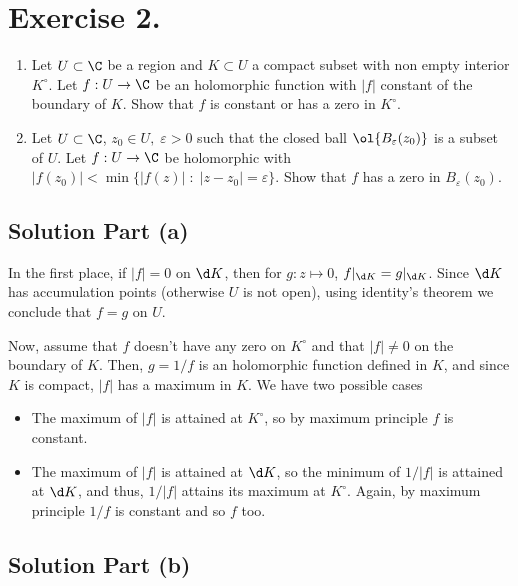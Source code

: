 \section*{Exercise 2.}

\begin{enumerate}[label = (\alph*)]
    \item Let $U\subset \C$ be a region and $K\subset U$ a compact subset with non empty interior $K^\circ$. Let $f: U \to \C$ be an holomorphic function with $|f|$ constant of the boundary of $K$. Show that $f$ is constant or has a zero in $K^\circ$.
    \item Let $U \subset \C$, $z_0 \in U,\; \varepsilon > 0$ such that the closed ball $\ol{B_\varepsilon(z_0)}$ is a subset of $U$. Let $f: U \to \C$ be holomorphic with $|f(z_0)| < \min\{|f(z)| \;:\; |z-z_0| = \varepsilon\}$. Show that $f$ has a zero in $B_\varepsilon(z_0)$.
\end{enumerate}

\subsection*{Solution Part (a)}

In the first place, if $|f| = 0$ on $\d K$, then for $g: z \mapsto 0$, $ f|_{\d K} = g|_{\d K}$. Since $\d K$ has accumulation points (otherwise $U$ is not open), using identity's theorem we conclude that $f = g$ on $U$.

Now, assume that $f$ doesn't have any zero on $K^\circ$ and that $|f| \neq 0$ on the boundary of $K$. Then, $g = 1/f$ is an holomorphic function defined in $K$, and since $K$ is compact, $|f|$ has a maximum in $K$. We have two possible cases
\begin{itemize}
    \item The maximum of $|f|$ is attained at $K^\circ$, so by maximum principle $f$ is constant.
    \item The maximum of $|f|$ is attained at $\d K$, so the minimum of $1/|f|$ is attained at $\d K$, and thus, $1/|f|$ attains its maximum at $K^\circ$. Again, by maximum principle $1/f$ is constant and so $f$ too.
\end{itemize}

\subsection*{Solution Part (b)}

